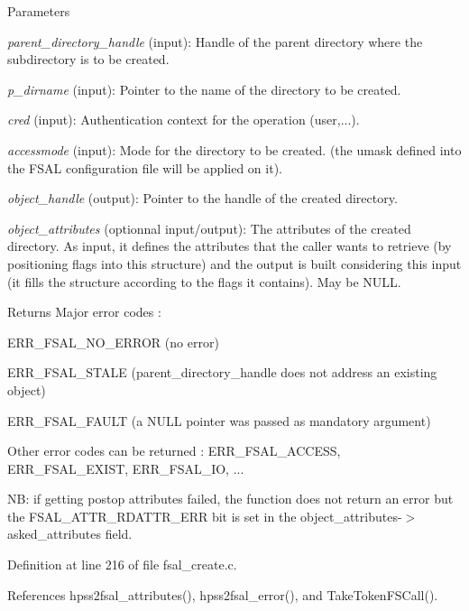 \begin{DoxyParams}{Parameters}
\item[{\em parent\_\-directory\_\-handle}](input): Handle of the parent directory where the subdirectory is to be created. \item[{\em p\_\-dirname}](input): Pointer to the name of the directory to be created. \item[{\em cred}](input): Authentication context for the operation (user,...). \item[{\em accessmode}](input): Mode for the directory to be created. (the umask defined into the FSAL configuration file will be applied on it). \item[{\em object\_\-handle}](output): Pointer to the handle of the created directory. \item[{\em object\_\-attributes}](optionnal input/output): The attributes of the created directory. As input, it defines the attributes that the caller wants to retrieve (by positioning flags into this structure) and the output is built considering this input (it fills the structure according to the flags it contains). May be NULL.\end{DoxyParams}
\begin{DoxyReturn}{Returns}
Major error codes :
\begin{DoxyItemize}
\item ERR\_\-FSAL\_\-NO\_\-ERROR (no error)
\item ERR\_\-FSAL\_\-STALE (parent\_\-directory\_\-handle does not address an existing object)
\item ERR\_\-FSAL\_\-FAULT (a NULL pointer was passed as mandatory argument)
\item Other error codes can be returned : ERR\_\-FSAL\_\-ACCESS, ERR\_\-FSAL\_\-EXIST, ERR\_\-FSAL\_\-IO, ...
\end{DoxyItemize}
\end{DoxyReturn}
NB: if getting postop attributes failed, the function does not return an error but the FSAL\_\-ATTR\_\-RDATTR\_\-ERR bit is set in the object\_\-attributes-\/$>$asked\_\-attributes field. 

Definition at line 216 of file fsal\_\-create.c.

References hpss2fsal\_\-attributes(), hpss2fsal\_\-error(), and TakeTokenFSCall().
